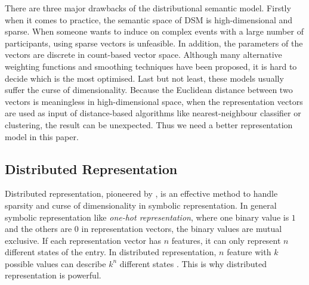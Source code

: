 \documentclass[a4paper]{article}
\begin{document}
There are three major drawbacks of the distributional semantic model. Firstly when it comes to practice, the semantic space of DSM is high-dimensional and sparse. When someone wants to induce on complex events with a large number of participants, using sparse vectors is unfeasible. In addition, the parameters of the vectors are discrete in count-based vector space. Although many alternative weighting functions and smoothing techniques have been proposed, it is hard to decide which is the most optimised. Last but not least, these models usually suffer the curse of dimensionality. Because the Euclidean distance between two vectors is meaningless in high-dimensional space, when the representation vectors are used as input of distance-based algorithms like nearest-neighbour classifier or clustering, the result can be unexpected. Thus we need a better representation model in this paper. 

\subsection{Distributed Representation} \label{sec:repr}
Distributed representation, pioneered by \citet{hinton1986learning}, is an effective method to handle sparsity and curse of dimensionality in symbolic representation. In general symbolic representation like \textit{one-hot representation}, where one binary value is $1$ and the others are $0$ in representation vectors, the binary values are mutual exclusive. If each representation vector has $n$ features, it can only represent $n$ different states of the entry. In distributed representation, $n$ feature with $k$ possible values can describe $k^n$ different states \citep{Goodfellow-et-al-2016}. This is why distributed representation is powerful. 
\end{document}
